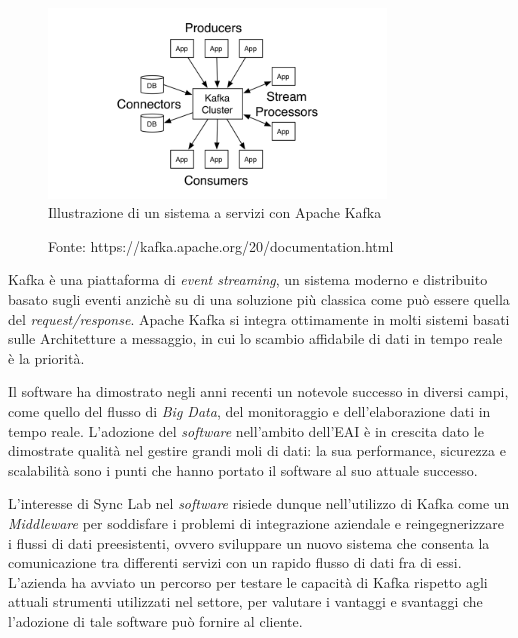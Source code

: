 \bigskip
\begin{figure}[h]
  \begin{center}
    \includegraphics[width=0.8\textwidth]{images/kafka.png}\\
    \caption{Illustrazione di un sistema a servizi con Apache Kafka}
    \captionsetup{aboveskip=2pt,font=it}
    \caption*{Fonte: https://kafka.apache.org/20/documentation.html}
  \end{center}
\end{figure}

Kafka è una piattaforma di \textit{event streaming}, un sistema moderno e distribuito basato sugli eventi anzichè su di una soluzione più classica come può essere quella del \textit{request/response}.
Apache Kafka si integra ottimamente in molti sistemi basati sulle Architetture a messaggio, in cui lo scambio affidabile di dati in tempo reale è la priorità.

Il software ha dimostrato negli anni recenti un notevole successo in diversi campi, come quello del flusso di \textit{Big Data}, del monitoraggio e dell'elaborazione dati in tempo reale.
L'adozione del \textit{software} nell'ambito dell'EAI è in crescita dato le dimostrate qualità nel gestire grandi moli di dati: la sua performance, sicurezza e scalabilità sono i punti che hanno portato il software al suo attuale successo.

L'interesse di Sync Lab nel \textit{software} risiede dunque nell'utilizzo di Kafka come un  \textit{Middleware} per soddisfare i problemi di integrazione aziendale e reingegnerizzare i flussi di dati preesistenti, ovvero sviluppare un nuovo sistema che consenta la comunicazione tra differenti servizi con un rapido flusso di dati fra di essi.
L'azienda ha avviato un percorso per testare le capacità di Kafka rispetto agli attuali strumenti utilizzati nel settore, per valutare i vantaggi e svantaggi che l'adozione di tale software può fornire al cliente.

